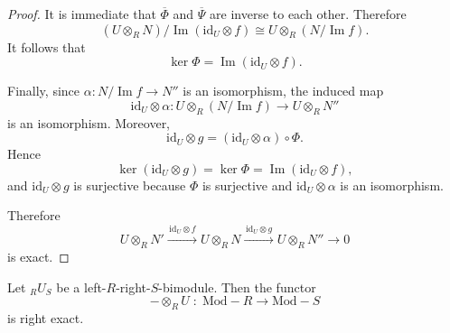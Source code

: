 \begin{proof}
    It is immediate that $\overline{\Phi}$ and $\overline{\Psi}$ are inverse to each other. Therefore
    \[
        (U\otimes_R N)/\operatorname{Im}(\mathrm{id}_U\otimes f)
        \cong
        U\otimes_R (N/\operatorname{Im} f).
    \]
    It follows that
    \[
        \ker\Phi=\operatorname{Im}(\mathrm{id}_U\otimes f).
    \]

    Finally, since $\alpha:N/\operatorname{Im} f\to N''$ is an isomorphism, the induced map
    \[
        \mathrm{id}_U\otimes \alpha:
        U\otimes_R (N/\operatorname{Im} f)
        \longrightarrow
        U\otimes_R N''
    \]
    is an isomorphism. Moreover,
    \[
        \mathrm{id}_U\otimes g
        =
        (\mathrm{id}_U\otimes \alpha)\circ \Phi.
    \]
    Hence
    \[
        \ker(\mathrm{id}_U\otimes g)=\ker\Phi=\operatorname{Im}(\mathrm{id}_U\otimes f),
    \]
    and $\mathrm{id}_U\otimes g$ is surjective because $\Phi$ is surjective and $\mathrm{id}_U\otimes \alpha$ is an isomorphism.

    Therefore
    \[
        U\otimes_R N' \xrightarrow{\,\mathrm{id}_U\otimes f\,}
        U\otimes_R N \xrightarrow{\,\mathrm{id}_U\otimes g\,}
        U\otimes_R N'' \longrightarrow 0
    \]
    is exact.
\end{proof}


\begin{theorem}
    Let ${}_RU_{S}$ be a left-$R$-right-$S$-bimodule. Then the functor
    \[
        -\otimes_R U \;:\; \text{Mod}-R\longrightarrow \text{Mod}-S
    \]
    is right exact.
\end{theorem}

